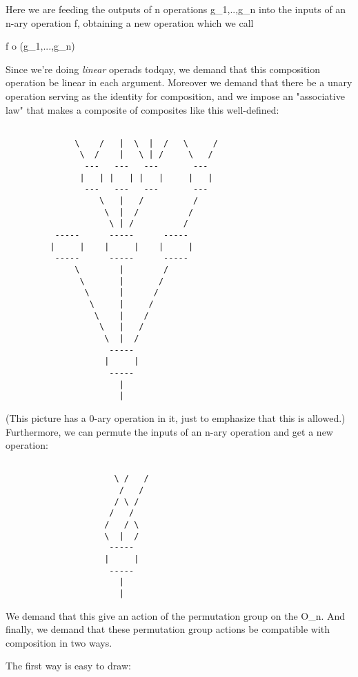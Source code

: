 Here we are feeding the outputs of n operations
g_{1},..,g_{n} into the inputs of an n-ary operation
f, obtaining a new operation which we call

f o (g_{1},...,g_{n})

Since we're doing \emph{linear} operads todqay, we demand that this
composition operation be linear in each argument.  Moreover we demand
that there be a unary operation serving as the identity for
composition, and we impose an "associative law" that makes a
composite of composites like this well-defined:


\begin{verbatim}

              \    /   |  \  |  /   \     / 
               \  /    |   \ | /     \   / 
                ---   ---   ---       ---
               |   | |   | |   |     |   |
                ---   ---   ---       ---
                   \   |   /          /
                    \  |  /          / 
                     \ | /          / 
          -----      -----      -----
         |     |    |     |    |     |
          -----      -----      -----
              \        |        /  
               \       |       /   
                \      |      /
                 \     |     / 
                  \    |    / 
                   \   |   /   
                    \  |  /
                     -----
                    |     | 
                     -----
                       |
                       |
\end{verbatim}
    
(This picture has a 0-ary operation in it, just to emphasize that this
is allowed.)  Furthermore, we can permute the inputs of an n-ary
operation and get a new operation:
                      

\begin{verbatim}

                      \ /   /
                       /   /
                      / \ /    
                     /   /   
                    /   / \
                    \  |  /
                     -----
                    |     | 
                     -----
                       |
                       |
\end{verbatim}
    

We demand that this give an action of the permutation group on the
O_{n}.  And finally, we demand that these permutation group
actions be compatible with composition in two ways.

The first way is easy to draw:


